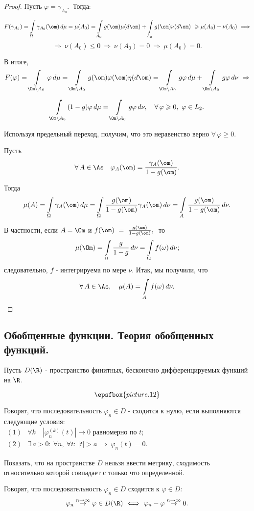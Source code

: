 \documentclass[a4paper]{article}
\newcommand{\dn}{\,d\nu}
\newcommand{\nsb}{n\rightarrow \infty} %
\newcommand{\fo}{f(\omega)}
\newcommand{\io} {\int \limits_{\Omega}}
\newcommand{\ff} {\varphi}
\begin{document}
\begin{proof}
Пусть $\varphi = \gamma_{A_0}. \ $ Тогда:

$$F(\gamma_{A_0}) = \io \gamma_{A_0}(\om) \, d\mu = \mu(A_0) = \int
\limits_{A_0} g(\om) \mu (d\om) + \int \limits_{A_0} g(\om)
\nu(d\om) \ \geqslant \mu(A_0) + \nu(A_0) \ \Longrightarrow$$
$$\Longrightarrow \ \nu(A_0) \leqslant 0 \ \Rightarrow \ \nu(A_0)
=0\  \Rightarrow \  \mu (A_0) =0.$$

В итоге,
$$F(\varphi) = \int \limits_{\Om \setminus A_0} \varphi
\, d\mu = \int \limits_{\Om \setminus A_0} g(\om) \varphi(\om)
\eta( d\om) = \int \limits_{\Om \setminus A_0} g \varphi \, d\mu +
\int \limits_{\Om \setminus A_0} g \varphi \, d\nu \
\Rightarrow$$

$$\int \limits_{\Om \setminus A_0} (1 - g) \varphi \, d\mu = \int
\limits_{\Om \setminus A_0} g \varphi \, d\nu, \quad  \forall\,
\varphi \geqslant 0, \ \varphi \in L_2.$$

Используя предельный переход, получим, что это неравенство верно
$\forall \, \varphi \geqslant 0.$

Пусть
$$\forall\, A \in \As \quad \varphi_A (\om) =
\frac{\gamma_A(\om)}{1 - g(\om)}.$$

Тогда
$$\mu(A) = \io \gamma_A(\om) \, d\mu = \io \frac{g(\om)}{1-
g(\om)} \gamma_A (\om) \, d\nu = \int \limits_A \frac{g(\om)}{1-
g(\om)} \, d\nu.$$

В частности, если $A = \Om$ и $f(\om) \ = \ \frac{g(\om)}{1 -
g(\om)},\ $ то
$$\mu(\Om) = \io \frac{g}{1-g} \,
d\nu = \io \fo \dn;$$  следовательно, $f$ - интегрируема по мере
$\nu$. Итак, мы получили, что $$\forall \, A \in \As,
\quad \mu(A) = \int \limits_A \fo \dn.$$
\end{proof}

\subsection{Обобщенные функции. Теория обобщенных функций.}

Пусть $D(\R)$ - пространство финитных, бесконечно
дифференцируемых функций на $\R$.

$$\epsfbox{picture.12}$$

\begin{df}
Говорят, что последовательность $\varphi_n \in D$ - сходится к
нулю, если выполняются следующие условия:\\
$\begin{aligned} (1) & \forall k \quad
|\varphi_n^{(k)} (t)| \rightarrow 0 \text{ равномерно по } t; \\
(2) & \exists \, a>0:  \ \forall n , \ \forall t: \ |t|>a\
\Rightarrow\ \varphi_n(t) = 0.
\end{aligned}$
\end{df}
\begin{problem}Показать, что на пространстве $D$ нельзя ввести метрику, сходимость
относительно которой совпадает с только что определенной.
\end{problem}
\begin{df}Говорят, что последовательность $\ff_n \in D$ сходится к
$\ff \in D$:
$$\varphi_n \stackrel{\nsb}\rightarrow \varphi \in D(\R)\
\Longleftrightarrow \  \varphi_n - \varphi \stackrel{n \rightarrow
\infty}\rightarrow 0.$$
\end{df}
\end{document}
